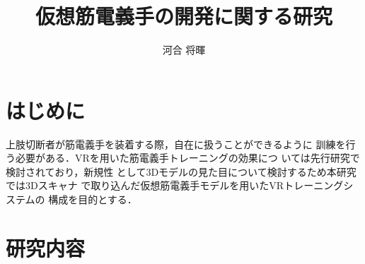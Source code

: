 \documentclass{ltjsarticle}
\title{仮想筋電義手の開発に関する研究}
\author{河合 将暉}
\begin{document}
\maketitle

\section{はじめに}
	上肢切断者が筋電義手を装着する際，自在に扱うことができるように
	訓練を行う必要がある．VRを用いた筋電義手トレーニングの効果につ
	いては先行研究\cite{ref:1}\cite{ref:2}で検討されており，新規性
	として3Dモデルの見た目について検討するため本研究では3Dスキャナ
	で取り込んだ仮想筋電義手モデルを用いたVRトレーニングシステムの
	構成を目的とする．
\section{研究内容}
\end{document}
